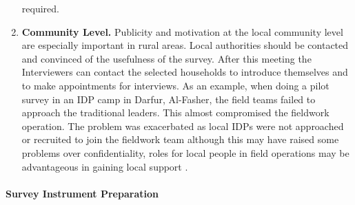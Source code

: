 \documentclass[
]{article}
\begin{document}
\begin{enumerate}
  required.
\item
  \textbf{Community Level.} Publicity and motivation at the local
  community level are especially important in rural areas. Local
  authorities should be contacted and convinced of the usefulness of
  the survey. After this meeting the Interviewers can contact the
  selected households to introduce themselves and to make appointments
  for interviews. As an example, when doing a pilot survey in an IDP
  camp in Darfur, Al-Fasher, the field teams failed to approach the
  traditional leaders. This almost compromised the fieldwork
  operation. The problem was exacerbated as local IDPs were not
  approached or recruited to join the fieldwork team although this may
  have raised some problems over confidentiality, roles for local
  people in field operations may be advantageous in gaining local
  support .
\end{enumerate}

\hypertarget{survey-instrument-preparation}{%
\paragraph{Survey Instrument Preparation}\label{survey-instrument-preparation}}
\end{document}
